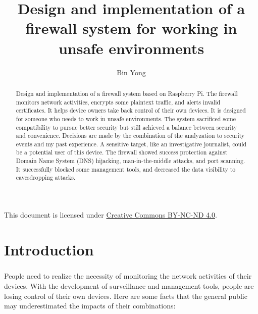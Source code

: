 \documentclass[mscthesis]{usiinfthesis}
\title{Design and implementation of a firewall system for working in unsafe environments} %
\author{Bin Yong} %
\begin{document}

\maketitle %

\frontmatter %

\begin{abstract}
  \paragraph{}
  Design and implementation of a firewall system based on Raspberry Pi. The firewall monitors network activities, encrypts some plaintext traffic, and alerts invalid certificates. It helps device owners take back control of their own devices. It is designed for someone who needs to work in unsafe environments. The system sacrificed some compatibility to pursue better security but still achieved a balance between security and convenience. Decisions are made by the combination of the analyzation to security events and my past experience. A sensitive target, like an investigative journalist, could be a potential user of this device. The firewall showed success protection against Domain Name System (DNS) hijacking, man-in-the-middle attacks, and port scanning. It successfully blocked some management tools, and decreased the data visibility to eavesdropping attacks.
\end{abstract}

\begin{acknowledgements}
  \paragraph{}
  This document is licensed under \href{https://creativecommons.org/licenses/by-nc-nd/4.0/}{Creative Commons BY-NC-ND 4.0}.
\end{acknowledgements}

\tableofcontents
\listoffigures %
\listoftables %

\mainmatter

\chapter{Introduction}
\paragraph{}
People need to realize the necessity of monitoring the network activities of their devices. With the development of surveillance and management tools, people are losing control of their own devices. Here are some facts that the general public may underestimated the impacts of their combinations:
\end{document}
